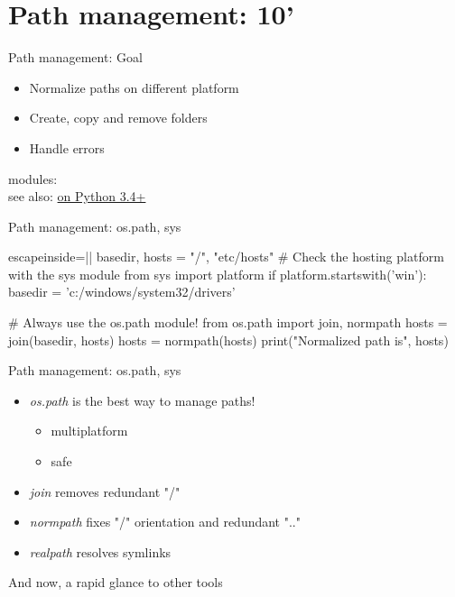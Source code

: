 \section{Path management: 10'}

\begin{pyframe}{Path management: Goal}
\Large
\begin{itemize}
\item Normalize paths on different platform
\item Create, copy and remove folders
\item Handle errors
\end{itemize}
modules:  \\
see also: \href{https://docs.python.org/3/library/pathlib.html}{ on Python 3.4+}
\end{pyframe}

\begin{pyframe}{Path management: os.path, sys}
\begin{pycode*}{escapeinside=||}
basedir, hosts = "/", "etc/hosts" 
# Check the hosting platform with the sys module
from sys import platform
if platform.startswith('win'):
    basedir = 'c:/windows/system32/drivers'

# Always use the os.path module!
from os.path import join, normpath 
hosts = join(basedir, hosts)
hosts = normpath(hosts)
print("Normalized path is", hosts)
\end{pycode*}
\end{pyframe}

\begin{pyframe}{Path management: os.path, sys}
\Large
\begin{itemize}
\item \emph{os.path} is the best way to manage paths!
\begin{itemize}
 \Large
 \item multiplatform
 \item safe
 \end{itemize}
 
\item \emph{join} removes redundant "/"
\item \emph{normpath} fixes "/" orientation and redundant ".."
\item \emph{realpath} resolves symlinks
\end{itemize}
And now, a rapid glance to other tools \ellipsis
\end{pyframe}

